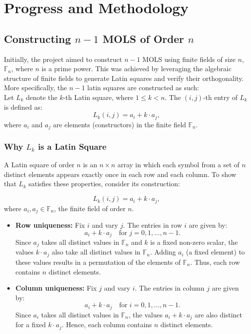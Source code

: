 \documentclass[12pt]{article}
\begin{document}
\section{Progress and Methodology}
\subsection{Constructing \(n-1\) MOLS of Order \(n\)}
Initially, the project aimed to construct \(n-1\) MOLS using finite fields of size \(n\), $\mathbb F_n$, where \(n\) is a prime power. This was achieved by leveraging the algebraic structure of finite fields to generate Latin squares and verify their orthogonality. More specifically, the \(n-1\) latin squares are constructed as such: \\
Let \( L_k \) denote the \( k \)-th Latin square, where \( 1 \leq k < n \). The \((i, j)\)-th entry of \( L_k \) is defined as:
\[
L_k(i, j) = a_i + k \cdot a_j,
\]
where \( a_i \) and \( a_j \) are elements (constructors) in the finite field \( \mathbb{F}_n \). \\

\subsubsection{Why \( L_k \) is a Latin Square} 

A Latin square of order \( n \) is an \( n \times n \) array in which each symbol from a set of \( n \) distinct elements appears exactly once in each row and each column. To show that \( L_k \) satisfies these properties, consider its construction:

\[
L_k(i, j) = a_i + k \cdot a_j,
\]
where \( a_i, a_j \in \mathbb{F}_n \), the finite field of order \( n \).

\begin{itemize}
    \item \textbf{Row uniqueness:} Fix \( i \) and vary \( j \). The entries in row \( i \) are given by:
    \[
    a_i + k \cdot a_j \quad \text{for } j = 0, 1, \dots, n-1.
    \]
    Since \( a_j \) takes all distinct values in \( \mathbb{F}_n \) and \( k \) is a fixed non-zero scalar, the values \( k \cdot a_j \) also take all distinct values in \( \mathbb{F}_n \). Adding \( a_i \) (a fixed element) to these values results in a permutation of the elements of \( \mathbb{F}_n \). Thus, each row contains \( n \) distinct elements.

    \item \textbf{Column uniqueness:} Fix \( j \) and vary \( i \). The entries in column \( j \) are given by:
    \[
    a_i + k \cdot a_j \quad \text{for } i = 0, 1, \dots, n-1.
    \]
    Since \( a_i \) takes all distinct values in \( \mathbb{F}_n \), the values \( a_i + k \cdot a_j \) are also distinct for a fixed \( k \cdot a_j \). Hence, each column contains \( n \) distinct elements.
\end{itemize}
\end{document}
